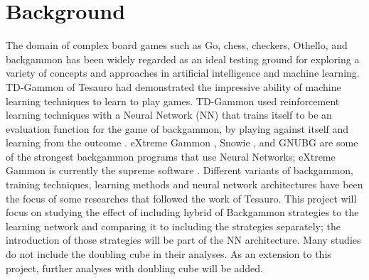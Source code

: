 \chapter{Background}
The domain of complex board games such as Go, chess, checkers, Othello, and backgammon has been widely regarded as an ideal testing ground for exploring a variety of concepts and approaches in artificial intelligence and machine learning. TD-Gammon  of Tesauro \cite{DBLP:conf/icml/Tesauro92,DBLP:journals/ai/Tesauro02} had demonstrated the impressive ability of machine learning techniques to learn to play games. TD-Gammon used reinforcement learning techniques with a Neural Network (NN) that trains itself to be an evaluation function for the game of backgammon, by playing against itself and learning from the outcome \cite{DBLP:journals/ai/Tesauro02}. eXtreme Gammon \cite{exg}, Snowie \cite{snowie}, and GNUBG \cite{gnubg} are some of the strongest backgammon programs that use Neural Networks; eXtreme Gammon is currently the supreme software \cite{MichaelDepreliStudy2012}. Different variants of backgammon\cite{DBLP:conf/evoW/PapahristouR11,DBLP:conf/ifip12/PapahristouR12}, training techniques, learning methods and neural network architectures have been the focus of some researches that followed the work of Tesauro. This project will focus on studying the effect of including hybrid of Backgammon strategies to the learning network and comparing it to including the strategies separately; the introduction of those strategies will be part of the NN architecture. Many studies do not include the doubling cube in their analyses. As an extension to this project, further analyses with doubling cube will be added.